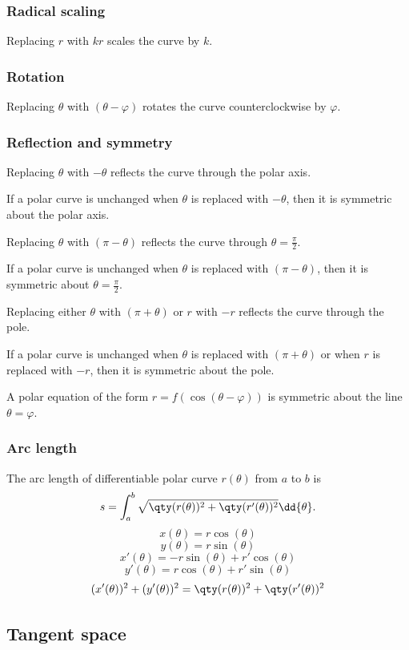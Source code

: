 \documentclass[a4paper,12pt]{report}
\begin{document}
\begin{itemize}
\begin{itemize}
\subsubsection{Radical scaling}
Replacing $r$ with $kr$ scales the curve by $k$.
\subsubsection{Rotation}
Replacing $\theta$ with $(\theta-\varphi)$ rotates the curve counterclockwise by $\varphi$.
\subsubsection{Reflection and symmetry}
Replacing $\theta$ with $-\theta$ reflects the curve through the polar axis.

If a polar curve is unchanged when $\theta$ is replaced with $-\theta$, then it is symmetric about the polar axis.

Replacing $\theta$ with $(\pi-\theta)$ reflects the curve through $\theta=\frac{\pi}{2}$.

If a polar curve is unchanged when $\theta$ is replaced with $(\pi-\theta)$, then it is symmetric about $\theta=\frac{\pi}{2}$.

Replacing either $\theta$ with $(\pi+\theta)$ or $r$ with $-r$ reflects the curve through the pole.

If a polar curve is unchanged when $\theta$ is replaced with $(\pi+\theta)$ or when $r$ is replaced with $-r$, then it is symmetric about the pole.

A polar equation of the form $r=f(\cos(\theta-\varphi))$ is symmetric about the line $\theta=\varphi$.
\subsubsection{Arc length}
The arc length of differentiable polar curve $r(\theta)$ from $a$ to $b$ is
\[s=\int_a^b\sqrt{\qty(r(\theta))^2+\qty(r'(\theta))^2}\dd{\theta}.\]
\bpr
\[x(\theta)=r\cos(\theta)\]
\[y(\theta)=r\sin(\theta)\]
\[x'(\theta)=-r\sin(\theta)+r'\cos(\theta)\]
\[y'(\theta)=r\cos(\theta)+r'\sin(\theta)\]
\[(x'(\theta))^2+(y'(\theta))^2=\qty(r(\theta))^2+\qty(r'(\theta))^2\]
\epr
\subsection{Tangent space}

\end{itemize}
\end{itemize}
\end{document}
